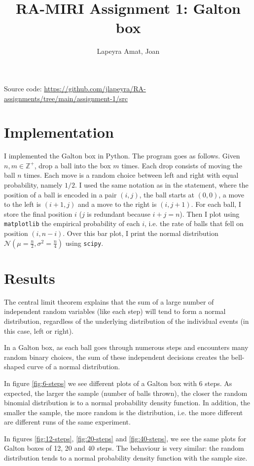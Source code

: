 \documentclass{article}
\title{RA-MIRI Assignment 1: Galton box}
\author{Lapeyra Amat, Joan}
\begin{document}
\maketitle

Source code: \url{https://github.com/jlapeyra/RA-assignments/tree/main/assignment-1/src}

\section{Implementation}
I implemented the Galton box in Python. The program goes as follows. Given $n, m \in \mathbb{Z}^+$, drop a ball into the box $m$ times. Each drop consists of moving the ball $n$ times. Each move is a random choice between left and right with equal probability, namely $1/2$. I used the same notation as in the statement, where the position of a ball is encoded in a pair $(i,j)$, the ball starts at $(0,0)$, a move to the left is $(i+1,j)$ and a move to the right is $(i,j+1)$. For each ball, I store the final position $i$ ($j$ is redundant because $i+j=n$). Then I plot using \texttt{matplotlib} the empirical probability of each $i$, i.e. the rate of balls that fell on position $(i,n-i)$. Over this bar plot, I print the normal distribution $\mathcal{N}(\mu=\frac{n}{2}, \sigma^2=\frac{n}{4})$ using \texttt{scipy}.

\section{Results}

The central limit theorem explains that the sum of a large number of independent random variables (like each step) will tend to form a normal distribution, regardless of the underlying distribution of the individual events (in this case, left or right).

In a Galton box, as each ball goes through numerous steps and encounters many random binary choices, the sum of these independent decisions creates the bell-shaped curve of a normal distribution.

In figure \ref{fig:6-steps} we see different plots of a Galton box with 6 steps. As expected, the larger the sample (number of balls thrown), the closer the random binomial distribution is to a normal probability density function. In addition, the smaller the sample, the more random is the distribution, i.e. the more different are different runs of the same experiment.

In figures \ref{fig:12-steps}, \ref{fig:20-steps} and \ref{fig:40-steps}, we see the same plots for Galton boxes of 12, 20 and 40 steps. The behaviour is very similar: the random distribution tends to a normal probability density function with the sample size.
\end{document}
